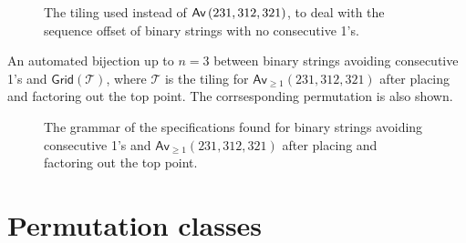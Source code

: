 \begin{figure}[ht!]
    \centering
    
    \caption{The tiling used instead of $\textsf{Av}\left(231,312,321\right)$, to deal with the sequence offset of binary strings with no consecutive 1's.}
    \label{fig:fibpermoffbyone}
\end{figure}

\begin{table}[ht!]
    \centering
    
    \caption{An automated bijection up to $n=3$ between binary strings avoiding consecutive 1's and $\textsf{Grid}(\mathcal{T})$, where $\mathcal{T}$ is the tiling for $\textsf{Av}_{\geq1}(231,312,321)$ after placing and factoring out the top point. The corrsesponding permutation is also shown.}
    \label{tab:wordtilmap}
\end{table}




\begin{figure}
    \centering
    
    \caption{The grammar of the specifications found for binary strings avoiding consecutive 1's and $\textsf{Av}_{\geq1}(231,312,321)$ after placing and factoring out the top point.}
    \label{fig:fibwordpermtrees}
\end{figure}

\section{Permutation classes}
